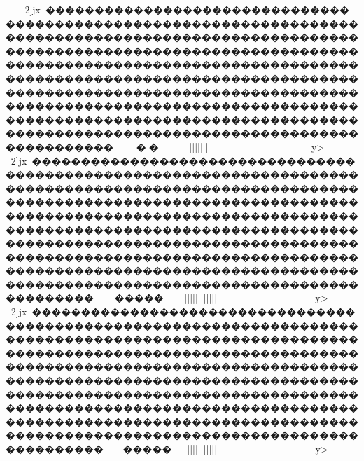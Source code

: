 {{{{{{{{{{{{{{{{{{{{{{{{{{{{{{{{{{{{{{{{{{{{{{{{{{{{{{{{{{{{{{{{{{{{{{{{{{{{{{{{{{{{{{{{{{{{{{{{{{{{{{{{{{{{{{{{{{{{{{{{{{{{{{{{{{{{{{{{{{{{{{{{{{{{{{{{{{{{{{{{{{{{{{{{{{{{{{{{{{{{{{{{{{{{{{{{{{{{{{{{{{{{{{{{{{{{{{{{{{{{{{{{{{{{{{{{{{{{{{{{{{{{{{{{{{{{{{{{{{{{{{{{{{{{{{{{{{{{{{{{{{{{{{{{{{{{{{{{{{{{{{{{{{{{{{{{{{{{{{{{{{{{{{{{{{{{{{{{{{{{{{{{{{{{{{{{{{{{{{{{{{{{{{{{{{{{{{{{{{{{{{{{{{{{{{{{{{{{{{{{{{{{{{{{{{{{{{{{{{{{{{{{{{{{{{{{{{{{{{{{{{{{{{{{{{{{{{{{{{{{{{{{{{{{{{{{{{{{{{{{{{{{{{{{{{{{{{{{{{{{{{{{{{{{{{{{{{{{{{{{{{{{{{{{{{{{{{{{{{{{{{{{{{{{{{{{{{{{{{{{{{{{{{{{{{{{{{{{{{{{{{{{{{{{{{{{{{{{{{{{{{{{{{{{{{{{{{{{{{{{{{{{{{{{{{{{{{{{{{{{{{{{{{{{{{{{{{{{{{{{{{{{{{{{{{{{{{{{{{{{{{{{{{{{{{{{{{{{{{{{{{{{{{{{{{{{{{{{{{{{{{{{{{{{{{{{{{{{{{{{{{{{{{{{{{{{{{{{{{{{{{{{{{{{{{{{{{{{{{{{{{{{{{{{{{{{{{{{{{{{{{{{{{{{{{{{{{{{{{{{{{{{{{{{{{{{{{{{{{{{{{{{{{{{{{{{{{{{{{{{{{{{{{{{{{{{{{{{{{{{{{{{{{{{{{{{{{{{{{{{{{{{{{{{{{{{{{{{{{{{{{{2]jx~������������������������������������������������������������������������������������������������������������������������������������������������������������������������������������������������������������������������������������������������������������������������������������������������������������������������������������������������������������������������������~~~��~~~~}}}|||{{{{{{{{{{{{{{{{{{{{{{{{{{{{{{{{||||}}}}}}}}}}}}~~~~~~~~~~~~~~~~y>
				2]jx~������������������������������������������������������������������������������������������������������������������������������������������������������������������������������������������������������������������������������������������������������������������������������������������������������������������������������������������������������������������������������~~�����~~||||||{{{{{{{{{{{{{{{{{{{{{{{{{{{{{{{{||||}}}}}}}}||}}}~~~~~~~~~~~~~~~y>
				2]jx~������������������������������������������������������������������������������������������������������������������������������������������������������������������������������������������������������������������������������������������������������������������������������������������������������������������������������������������������������������������������������������~~||||||{{{{{{{{{{{{{{{{{{{{{{{{{{{{{{|||}}}}}}}}}}}||}}}~~~~~~~~~~~~~~~y>
}}}}}}}}}}}}}}}}}}}}}}}}}}}}}}}}}}}}}}}}}}}}}}}}}}}}}}}}}}}}}}}}}}}}}}}}}}}}}}}}}}}}}}}}}}}}}}}}}}}}}}}}}}}}}}}}}}}}}}}}}}}}}}}}}}}}}}}}}}}}}}}}}}}}}}}}}}}}}}}}}}}}}}}}}}}}}}}}}}}}}}}}}}}}}}}}}}}}}}}}}}}}}}}}}}}}}}}}}}}}}}}}}}}}}}}}}}}}}}}}}}}}}}}}}}}}}}}}}}}}}}}}}}}}}}}}}}}}}}}}}}}}}}}}}}}}}}}}}}}}}}}}}}}}}}}}}}}}}}}}}}}}}}}}}}}}}}}}}}}}}}}}}}}}}}}}}}}}}}}}}}}}}}}}}}}}}}}}}}}}}}}}}}}}}}}}}}}}}}}}}}}}}}}}}}}}}}}}}}}}}}}}}}}}}}}}}}}}}}}}}}}}}}}}}}}}}}}}}}}}}}}}}}}}}}}}}}}}}}}}}}}}}}}}}}}}}}}}}}}}}}}}}}}}}}}}}}}}}}}}}}}}}}}}}}}}}}}}}}}}}}}}}}}}}}}}}}}}}}}}}}}}}}}}}}}}}}}}}}}}}}}}}}}}}}}}}}}}}}}}}}}}}}}}}}}}}}}}}}}}}}}}}}}}}}}}}}}}}}}}}}}}}}}}}}}}}}}}}}}}}}}}}}}}}}}}}}}}}}}}}}}}}}}}}}}}}}}}}}}}}}}}}}}}}}}}}}}}}}}}}}}}}}}}}}}}}}}}}}}}}}}}}}}}}}}}}}}}}}}}}}}}}}}}}}}}}}}}}}}}}}}}}}}}}}}}}}}}}}}}}}}}}}}}}}}}}}}}}}}}}}}}}}}}}}}}}}}}}}}}}}}}}}}}}}}}}}}}}}}}}}}}}}}}}}}}}}}}}}}}}}}}}}}}}}}}}}}}}}}}}}}}}}}}}}}}}}}}}}}}}}}}}}}}}}}}}}}}}}}}}}}}}}}}}}}}}}}}}}}}}}}}}}}}}}}}}}}}}
